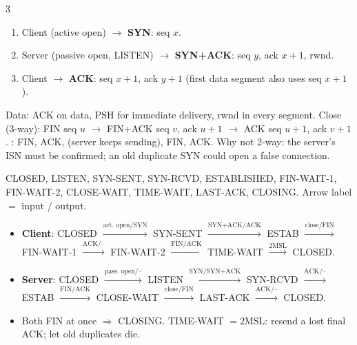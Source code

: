 \begin{multicols*}{3}
\noindent\begin{minipage}{\linewidth}
 
\begin{enumerate}
  \item Client (active open) $\to$ \textbf{SYN}: seq $x$.
  \item Server (passive open, LISTEN) $\to$ \textbf{SYN+ACK}: seq $y$, ack $x{+}1$, rwnd.
  \item Client $\to$ \textbf{ACK}: seq $x{+}1$, ack $y{+}1$ (first data segment also uses seq $x{+}1$).
\end{enumerate}
\end{minipage}\par
Data: ACK  on data, PSH for immediate delivery, rwnd in every segment.
Close (3-way): FIN seq $u$ $\to$ FIN+ACK seq $v$, ack $u{+}1$ $\to$ ACK seq $u{+}1$, ack $v{+}1$. : FIN, ACK, (server keeps sending), FIN, ACK.
Why not 2-way: the server's ISN must be confirmed; an old duplicate SYN could open a false connection.

 
CLOSED, LISTEN, SYN-SENT, SYN-RCVD, ESTABLISHED, FIN-WAIT-1, FIN-WAIT-2, CLOSE-WAIT, TIME-WAIT, LAST-ACK, CLOSING. Arrow label $=$ \textsf{input / output}.
\begin{itemize}
  \item \textbf{Client}: CLOSED $\xrightarrow{\text{act.\ open/SYN}}$ SYN-SENT $\xrightarrow{\text{SYN+ACK/ACK}}$ ESTAB $\xrightarrow{\text{close/FIN}}$ FIN-WAIT-1 $\xrightarrow{\text{ACK/--}}$ FIN-WAIT-2 $\xrightarrow{\text{FIN/ACK}}$ TIME-WAIT $\xrightarrow{\text{2MSL}}$ CLOSED.
  \item \textbf{Server}: CLOSED $\xrightarrow{\text{pass.\ open/--}}$ LISTEN $\xrightarrow{\text{SYN/SYN+ACK}}$ SYN-RCVD $\xrightarrow{\text{ACK/--}}$ ESTAB $\xrightarrow{\text{FIN/ACK}}$ CLOSE-WAIT $\xrightarrow{\text{close/FIN}}$ LAST-ACK $\xrightarrow{\text{ACK/--}}$ CLOSED.
  \item Both FIN at once $\Rightarrow$ CLOSING. TIME-WAIT $=2$MSL: resend a lost final ACK; let old duplicates die.
\end{itemize}


\end{multicols*}
